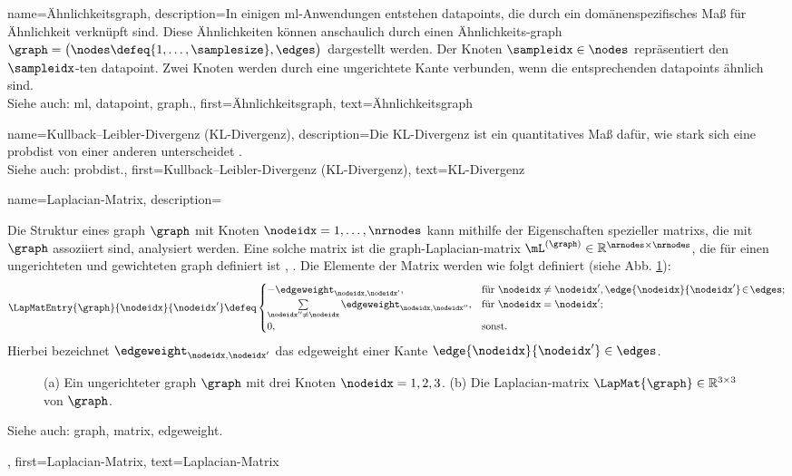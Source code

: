 {{{{
{name={Ähnlichkeitsgraph}, 
 description={In einigen \gls{ml}-Anwendungen entstehen \glspl{datapoint}, die durch ein 
 domänenspezifisches Maß für Ähnlichkeit verknüpft sind. Diese Ähnlichkeiten können anschaulich durch einen
  Ähnlichkeits-\gls{graph} 
	$\graph = \big(\nodes \defeq \{1, \ldots, \samplesize\}, \edges\big)$ dargestellt werden. 
	Der Knoten $\sampleidx \in \nodes$ repräsentiert den $\sampleidx$-ten \gls{datapoint}. Zwei Knoten werden durch
	 eine ungerichtete Kante verbunden, wenn die entsprechenden \glspl{datapoint} ähnlich sind.
	\\
	Siehe auch: \gls{ml}, \gls{datapoint}, \gls{graph}.},
 first={Ähnlichkeitsgraph},
 text={Ähnlichkeitsgraph} 
}

{name={Kullback–Leibler-Divergenz (KL-Divergenz)}, 
 description={Die KL-Divergenz ist ein quantitatives 
 Maß dafür, wie stark sich eine \gls{probdist} von einer anderen unterscheidet \cite{coverthomas}.
	\\
	Siehe auch: \gls{probdist}.},
 first={Kullback–Leibler-Divergenz (KL-Divergenz)},
 text={KL-Divergenz} 
}

{name={Laplacian-Matrix},
 description={Die Struktur eines \gls{graph} $\graph$ mit 
 	Knoten $\nodeidx=1, \ldots, \nrnodes$ kann mithilfe der Eigenschaften spezieller \glspl{matrix}, die mit $\graph$ assoziiert sind, analysiert werden. Eine solche \gls{matrix} ist die 
 	\gls{graph}-Laplacian-\gls{matrix} $\mL^{(\graph)} \in \mathbb{R}^{\nrnodes \times \nrnodes}$, 
 	die für einen ungerichteten und gewichteten \gls{graph} definiert ist \cite{Luxburg2007}, \cite{Ng2001}. 
 	Die Elemente der Matrix werden wie folgt definiert (siehe Abb. \ref{fig_lap_mtx_dict}):
 	\begin{equation}
 		\nonumber
 		\LapMatEntry{\graph}{\nodeidx}{\nodeidx'} \defeq \begin{cases} 
 			- \edgeweight_{\nodeidx,\nodeidx'}, & \mbox{für } \nodeidx \neq \nodeidx', \edge{\nodeidx}{\nodeidx'}\!\in\!\edges; \\ 
 			\sum\limits_{\nodeidx'' \neq \nodeidx} \edgeweight_{\nodeidx,\nodeidx''}, & \mbox{für } \nodeidx = \nodeidx'; \\ 
 			0, & \mbox{sonst.} 
 		\end{cases}
 	\end{equation}
 	Hierbei bezeichnet $\edgeweight_{\nodeidx,\nodeidx'}$ das \gls{edgeweight} einer Kante $\edge{\nodeidx}{\nodeidx'} \in \edges$. 
 	\begin{figure}[H]
 	\begin{center}
 	\caption{\label{fig_lap_mtx_dict} (a) Ein ungerichteter \gls{graph} $\graph$ mit drei Knoten $\nodeidx=1,2,3$. 
 		 (b) Die Laplacian-\gls{matrix} $\LapMat{\graph}  \in \mathbb{R}^{3 \times 3}$ von $\graph$.} 
 	\end{center}
 	\end{figure}
 	Siehe auch: \gls{graph}, \gls{matrix}, \gls{edgeweight}.},
 first={Laplacian-Matrix},
 text={Laplacian-Matrix}
}

}}}}
